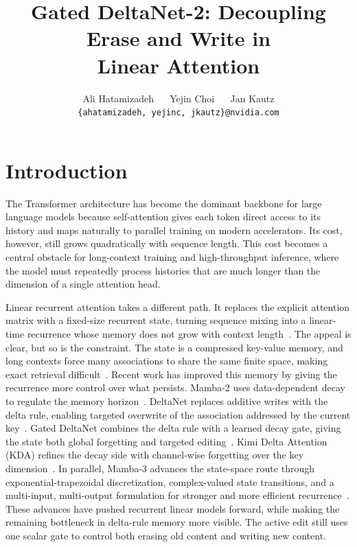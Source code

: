 \documentclass[10pt, logo, onecolumn, copyright]{nv}
\title{%
\centering
Gated DeltaNet-2: Decoupling Erase and Write in\\
Linear Attention%
}
\author{%
\vspace{-1.5em}
\centering
\fontsize{10.5pt}{18pt}\selectfont
Ali Hatamizadeh ~~ Yejin Choi ~~ Jan Kautz
\\
\vspace{1.3mm}
{\tt\small \{ahatamizadeh, yejinc, jkautz\}@nvidia.com}
\vspace{0.3em}
}
\begin{document}
\maketitle


\section{Introduction}
\label{sec_introduction}

The Transformer architecture has become the dominant backbone for large language models because self-attention gives each token direct access to its history and maps naturally to parallel training on modern accelerators. Its cost, however, still grows quadratically with sequence length. This cost becomes a central obstacle for long-context training and high-throughput inference, where the model must repeatedly process histories that are much longer than the dimension of a single attention head.

Linear recurrent attention takes a different path. It replaces the explicit attention matrix with a fixed-size recurrent state, turning sequence mixing into a linear-time recurrence whose memory does not grow with context length~\citep{katharopoulos_transformers_2020}. The appeal is clear, but so is the constraint. The state is a compressed key-value memory, and long contexts force many associations to share the same finite space, making exact retrieval difficult~\citep{linear-xmr-fastweight,zoology,arora_simple_2024,jelassi_repeat_2024,wen_rnns_2024,akyurek_-context_2024}. Recent work has improved this memory by giving the recurrence more control over what persists. Mamba-2 uses data-dependent decay to regulate the memory horizon~\citep{pmlr-v235-dao24a}. DeltaNet replaces additive writes with the delta rule, enabling targeted overwrite of the association addressed by the current key~\citep{widrow_adaptive_1988,linear-xmr-fastweight,yang2024parallelizing}. Gated DeltaNet combines the delta rule with a learned decay gate, giving the state both global forgetting and targeted editing~\citep{yang2025gated}. Kimi Delta Attention (KDA) refines the decay side with channel-wise forgetting over the key dimension~\citep{team2025kimi}. In parallel, Mamba-3 advances the state-space route through exponential-trapezoidal discretization, complex-valued state transitions, and a multi-input, multi-output formulation for stronger and more efficient recurrence~\citep{lahoti2026mamba3}. These advances have pushed recurrent linear models forward, while making the remaining bottleneck in delta-rule memory more visible. The active edit still uses one scalar gate to control both erasing old content and writing new content.
\end{document}
